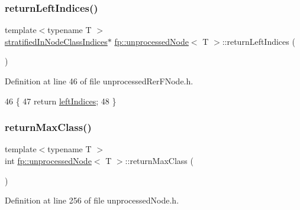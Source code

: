 \subsubsection{\texorpdfstring{return\+Left\+Indices()}{returnLeftIndices()}\hspace{0.1cm}{\footnotesize\ttfamily [2/2]}}
{\footnotesize\ttfamily template$<$typename T $>$ \\
\hyperlink{classfp_1_1stratifiedInNodeClassIndices}{stratified\+In\+Node\+Class\+Indices}$\ast$ \hyperlink{classfp_1_1unprocessedNode}{fp\+::unprocessed\+Node}$<$ T $>$\+::return\+Left\+Indices (\begin{DoxyParamCaption}{ }\end{DoxyParamCaption})\hspace{0.3cm}{\ttfamily [inline]}}



Definition at line 46 of file unprocessed\+Rer\+F\+Node.\+h.


\begin{DoxyCode}
46                                                                         \{
47                     \textcolor{keywordflow}{return} \hyperlink{classfp_1_1unprocessedNode_a8e39fa0144bbb78fd02d1973bd05b5f6}{leftIndices};
48                 \}
\end{DoxyCode}
\mbox{\label{classfp_1_1unprocessedNode_af038553809a2e6d1cbe04adaba1c6b21}} 
\subsubsection{\texorpdfstring{return\+Max\+Class()}{returnMaxClass()}\hspace{0.1cm}{\footnotesize\ttfamily [1/2]}}
{\footnotesize\ttfamily template$<$typename T $>$ \\
int \hyperlink{classfp_1_1unprocessedNode}{fp\+::unprocessed\+Node}$<$ T $>$\+::return\+Max\+Class (\begin{DoxyParamCaption}{ }\end{DoxyParamCaption})\hspace{0.3cm}{\ttfamily [inline]}}



Definition at line 256 of file unprocessed\+Node.\+h.


